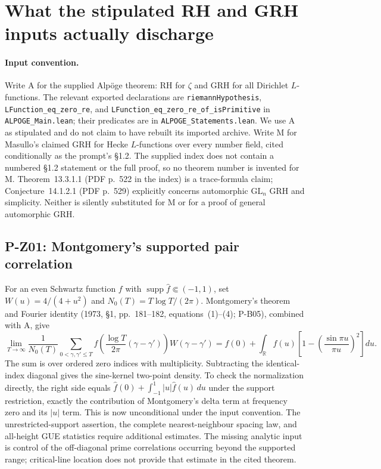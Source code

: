 \section{What the stipulated RH and GRH inputs actually discharge}

\paragraph{Input convention.}
Write A for the supplied Alp\"oge theorem: RH for $\zeta$ and GRH for all Dirichlet $L$-functions. The relevant exported declarations are \texttt{riemannHypothesis}, \texttt{LFunction\_eq\_zero\_re}, and \texttt{LFunction\_eq\_zero\_re\_of\_isPrimitive} in \texttt{ALPOGE\_Main.lean}; their predicates are in \texttt{ALPOGE\_Statements.lean}. We use A as stipulated and do not claim to have rebuilt its imported archive. Write M for Masullo's claimed GRH for Hecke $L$-functions over every number field, cited conditionally as the prompt's \S1.2. The supplied index does not contain a numbered \S1.2 statement or the full proof, so no theorem number is invented for M. Theorem~13.3.1.1 (PDF p.~522 in the index) is a trace-formula claim; Conjecture~14.1.2.1 (PDF p.~529) explicitly concerns automorphic $\mathrm{GL}_n$ GRH and simplicity. Neither is silently substituted for M or for a proof of general automorphic GRH.

\subsection{P-Z01: Montgomery's supported pair correlation}
For an even Schwartz function $f$ with $\operatorname{supp}\widehat f\Subset(-1,1)$, set $W(u)=4/(4+u^2)$ and $N_0(T)=T\log T/(2\pi)$. Montgomery's theorem and Fourier identity (1973, \S1, pp.~181--182, equations~(1)--(4); P-B05), combined with A, give
\[
 \lim_{T\to\infty}\frac1{N_0(T)}
 \sum_{0<\gamma,\gamma'\le T}
 f\left(\frac{\log T}{2\pi}(\gamma-\gamma')\right)W(\gamma-\gamma')
 = f(0)+\int_{\mathbb R}f(u)\left[1-\left(\frac{\sin\pi u}{\pi u}\right)^2\right]du.
\]
The sum is over ordered zero indices with multiplicity. Subtracting the identical-index diagonal gives the sine-kernel two-point density. To check the normalization directly, the right side equals
$\widehat f(0)+\int_{-1}^1|u|\widehat f(u)\,du$ under the support restriction, exactly the contribution of Montgomery's delta term at frequency zero and its $|u|$ term. This is now unconditional under the input convention. The unrestricted-support assertion, the complete nearest-neighbour spacing law, and all-height GUE statistics require additional estimates. The missing analytic input is control of the off-diagonal prime correlations occurring beyond the supported range; critical-line location does not provide that estimate in the cited theorem.

